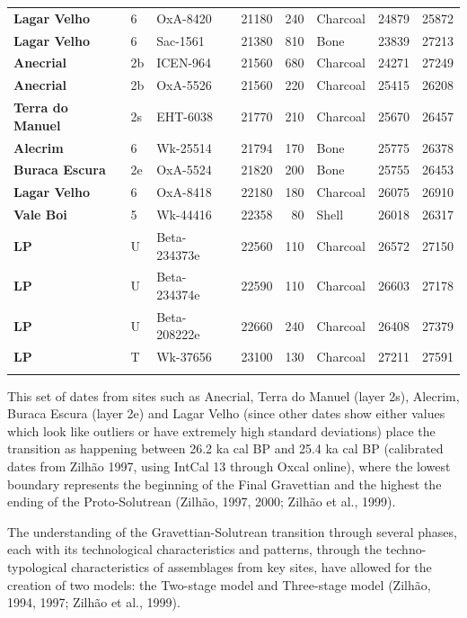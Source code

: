 \documentclass[12pt,twoside]{reedthesis}
\begin{document}
\begin{landscape}
\begin{longtable}[t]{>{\bfseries}lllrrlrr}
Lagar Velho & 6 & OxA-8420 & 21180 & 240 & Charcoal & 24879 & 25872\\
Lagar Velho & 6 & Sac-1561 & 21380 & 810 & Bone & 23839 & 27213\\
\addlinespace
Anecrial & 2b & ICEN-964 & 21560 & 680 & Charcoal & 24271 & 27249\\
Anecrial & 2b & OxA-5526 & 21560 & 220 & Charcoal & 25415 & 26208\\
Terra do Manuel & 2s & EHT-6038 & 21770 & 210 & Charcoal & 25670 & 26457\\
Alecrim & 6 & Wk-25514 & 21794 & 170 & Bone & 25775 & 26378\\
Buraca Escura & 2e & OxA-5524 & 21820 & 200 & Bone & 25755 & 26453\\
\addlinespace
Lagar Velho & 6 & OxA-8418 & 22180 & 180 & Charcoal & 26075 & 26910\\
Vale Boi & 5 & Wk-44416 & 22358 & 80 & Shell & 26018 & 26317\\
LP & U & Beta-234373e & 22560 & 110 & Charcoal & 26572 & 27150\\
LP & U & Beta-234374e & 22590 & 110 & Charcoal & 26603 & 27178\\
LP & U & Beta-208222e & 22660 & 240 & Charcoal & 26408 & 27379\\
\addlinespace
LP & T & Wk-37656 & 23100 & 130 & Charcoal & 27211 & 27591\\*
\end{longtable}
\end{landscape}
This set of dates from sites such as Anecrial, Terra do Manuel (layer 2s), Alecrim, Buraca Escura (layer 2e) and Lagar Velho (since other dates show either values which look like outliers or have extremely high standard deviations) place the transition as happening between 26.2 ka cal BP and 25.4 ka cal BP (calibrated dates from Zilhão 1997, using IntCal 13 through Oxcal online), where the lowest boundary represents the beginning of the Final Gravettian and the highest the ending of the Proto-Solutrean (Zilhão, 1997, 2000; Zilhão et al., 1999).

The understanding of the Gravettian-Solutrean transition through several phases, each with its technological characteristics and patterns, through the techno-typological characteristics of assemblages from key sites, have allowed for the creation of two models: the Two-stage model and Three-stage model (Zilhão, 1994, 1997; Zilhão et al., 1999).
\end{document}
